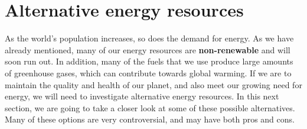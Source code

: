 
\section{Alternative energy resources}
\label{sec:mining:alternative energy}

As the world's population increases, so does the demand for energy. As we have already mentioned, many of our energy resources are \textbf{non-renewable} and will soon run out. In addition, many of the fuels that we use produce large amounts of greenhouse gases, which can contribute towards global warming. If we are to maintain the quality and health of our planet, and also meet our growing need for energy, we will need to investigate alternative energy resources. In this next section, we are going to take a closer look at some of these possible alternatives. Many of these options are very controversial, and may have both pros and cons.

